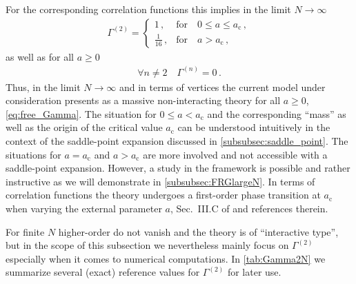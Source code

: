 For the corresponding \ipi{} correlation functions this implies in the limit ${N \rightarrow \infty}$
\begin{align}
	\Gamma^{(2)} =	\label{eq:two-point_exact}
	\begin{cases}
	1 \, ,				&	\text{for} \quad 0 \leq a \leq a_\mathrm{c} \, ,
	\\
	\tfrac{1}{16} \, ,	&	\text{for} \quad a>a_\mathrm{c} \, ,
\end{cases}
\end{align}
as well as for all $a \geq 0$ 
\begin{align}
	\forall n \neq 2 \quad \Gamma^{(n)} = 0 \, .	\label{eq:n-point_exact}
\end{align}
Thus, in the limit ${N \rightarrow \infty}$ and in terms of \ipi{} vertices the current model under consideration presents as a massive non-interacting theory for all $a \geq 0$, \cf{} \cref{eq:free_Gamma}.
The situation for $0\leq a<a_\mathrm{c}$ and the corresponding ``mass'' as well as the origin of the critical value $a_\mathrm{c}$ can be understood intuitively in the context of the saddle-point expansion discussed in \cref{subsubsec:saddle_point}.
The situations for $a =a_\mathrm{c}$ and $a >a_\mathrm{c}$ are more involved and not accessible with a saddle-point expansion. 
However, a study in the \frg{}  framework is possible and rather instructive as we will demonstrate in \cref{subsubsec:FRGlargeN}.
In terms of correlation functions the theory undergoes a first-order phase transition at $a_\mathrm{c}$ when varying the external parameter $a$, \cf{} Sec.~III.C of  and references therein.

For finite $N$ higher-order \nptFunctions{} do not vanish and the theory is of ``interactive type'', but in the scope of this subsection we nevertheless mainly focus on $\Gamma^{(2)}$ \dash{} especially when it comes to numerical computations. In \cref{tab:Gamma2N} we summarize several (exact) reference values for $\Gamma^{(2)}$ for later use.

\FloatBarrier
